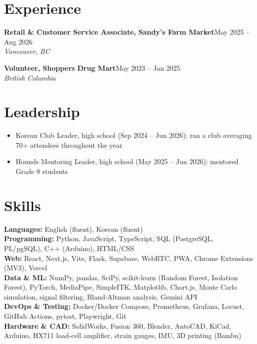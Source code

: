 \documentclass[10pt,letterpaper]{article}
\newcommand{\entry}[3]{\needspace{4\baselineskip}\textbf{#1}\hfill #2\\{\small\itshape #3}\par}
\begin{document}
\section{Experience}
\entry{Retail \& Customer Service Associate, Sandy's Farm Market}{May 2025 -- Aug 2026}{Vancouver, BC}
\entry{Volunteer, Shoppers Drug Mart}{May 2023 -- Jan 2025}{British Columbia}

\section{Leadership}
\begin{itemize}
  \item Korean Club Leader, high school (Sep 2024 -- Jun 2026): ran a club averaging 70+ attendees throughout the year
  \item Hounds Mentoring Leader, high school (May 2025 -- Jun 2026): mentored Grade 8 students
\end{itemize}

\section{Skills}
\textbf{Languages:} English (fluent), Korean (fluent)\\
\textbf{Programming:} Python, JavaScript, TypeScript, SQL (PostgreSQL, PL/pgSQL), C++ (Arduino), HTML/CSS\\
\textbf{Web:} React, Next.js, Vite, Flask, Supabase, WebRTC, PWA, Chrome Extensions (MV3), Vercel\\
\textbf{Data \& ML:} NumPy, pandas, SciPy, scikit-learn (Random Forest, Isolation Forest), PyTorch, MediaPipe, SimpleITK, Matplotlib, Chart.js, Monte Carlo simulation, signal filtering, Bland-Altman analysis, Gemini API\\
\textbf{DevOps \& Testing:} Docker/Docker Compose, Prometheus, Grafana, Locust, GitHub Actions, pytest, Playwright, Git\\
\textbf{Hardware \& CAD:} SolidWorks, Fusion 360, Blender, AutoCAD, KiCad, Arduino, HX711 load-cell amplifier, strain gauges, IMU, 3D printing (Bambu)
\end{document}
